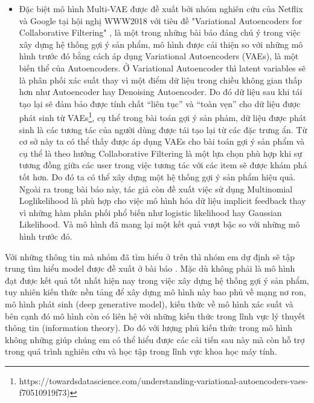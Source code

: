 \documentclass{article}[14pt]
\begin{document}
{\begin{itemize}
{   đó thì sẽ khó để tìm được sự tương đồng giữa các user trong việc tương tác 
   với item đó}; Bên cạnh đó có thể kể đến “Collaborative Denoising 
   Auto-Encoders for Top-N Recommender Systems” \cite{cde} nói về mô hình CDE 
   được đề xuất bởi nhóm nghiên cứu tại trường đại học Beihang, Trung Quốc, 
   cũng là một bài báo nổi bật trong việc áp dụng mô hình Autoencoders, mô hình 
   này sử dụng một biến thể của Autoencoders là Denoising Autoencoder để xây 
   dựng hệ thống gợi ý sản phẩm, điểm khác biệt của mô hình CDE là input của mô 
   hình sẽ được thêm nhiễu nhằm giúp mô hình tránh tình trạng overfitting. Và 
   theo bài báo thì CDE có được kết quả tốt nhất trên những tập dữ liệu được thực nghiệm
   tại thời điểm được đề xuất.
\item	Đặc biệt mô hình Multi-VAE được đề xuất bởi nhóm nghiên cứu của Netflix và 
Google tại hội nghị WWW2018 với tiêu đề "Variational Autoencoders for 
Collaborative Filtering" \cite{mvae}, là một trong những bài báo đáng chú ý trong việc xây 
dựng hệ thống gợi ý sản phẩm, mô hình được cải thiện so với những mô hình trước 
đó bằng cách áp dụng Variational Autoencoders (VAEs), là một biến thể của 
Autoencoders. Ở Variational Autoencoder thì latent variables sẽ là phân phối xác 
suất thay vì một điểm dữ liệu trong chiều không gian thấp hơn như Autoencoder 
hay Denoising Autoencoder. Do đó dữ liệu sau khi tái tạo lại sẽ đảm bảo được 
tính chất “liên tục” và “toàn vẹn” cho dữ liệu được phát sinh từ VAEs\footnote{https://towardsdatascience.com/understanding-variational-autoencoders-vaes-f70510919f73)},
cụ thể trong bài toán gợi ý sản phảm, dữ liệu được phát sinh là các tương tác của người dùng được tái tạo lại từ các đặc trưng ẩn.
Từ cơ sở này ta có thể thấy được áp dụng VAEs cho bài toán gợi ý sản phẩm và cụ 
thể là theo hướng Collaborative Filtering là một lựa chọn phù hợp khi sự tương 
đồng giữa các user trong việc tương tác với các item sẽ được khám phá tốt hơn. 
Do đó ta có thể xây dựng một hệ thống gợi ý sản phẩm hiệu quả. Ngoài ra trong 
bài báo này, tác giả còn đề xuất việc sử dụng Multinomial Loglikelihood là phù 
hợp cho việc mô hình hóa dữ liệu implicit feedback thay vì những hàm phân phối 
phổ biến như logistic likelihood hay Gaussian Likelihood. Và mô hình đã mang 
lại một kết quả vượt bậc so với những mô hình trước đó.

\end{itemize}
Với những thông tin mà nhóm đã tìm hiểu ở trên thì nhóm em dự định sẽ tập trung 
tìm hiểu model được đề xuất ở bài báo . Mặc dù không phải là mô hình đạt 
được kết quả tốt nhất hiện nay trong việc xây dựng hệ thống gợi ý sản phẩm, tuy 
nhiên kiến thức nền tảng để xây dựng mô hình này bao phủ về mạng nơ ron, mô 
hình phát sinh (deep generative model), kiến thức về mô hình xác suất và bên cạnh đó
mô hình còn có liên hệ với những kiến thức trong lĩnh vực lý thuyết thông tin (information theory).
Do đó với lượng phủ kiến thức trong mô hình không những giúp 
chúng em có thể hiểu được các cải tiến sau này mà còn hỗ trợ trong quá trình nghiên cứu 
và học tập trong lĩnh vực khoa học máy tính.
   
}
\end{document}
